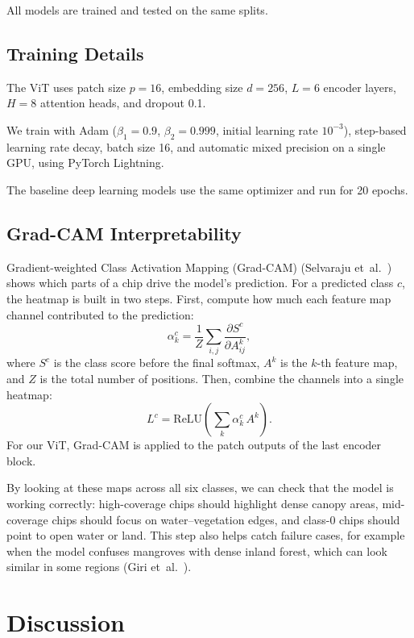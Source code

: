 \documentclass[conference,a4paper]{IEEEtran}
\begin{document}
All models are trained and tested on the same splits.

\subsection{Training Details}

The ViT uses patch size $p=16$, 
embedding size $d=256$, $L=6$ encoder layers, 
$H=8$ attention heads, and dropout 0.1. 

We train with Adam ($\beta_1=0.9$, $\beta_2=0.999$, initial learning rate $10^{-3}$), step-based learning rate decay, batch size 16, and automatic mixed precision on a single GPU, using PyTorch Lightning. 

The baseline deep learning models use the same optimizer and run for 20 epochs.

\subsection{Grad-CAM Interpretability}

Gradient-weighted Class Activation Mapping (Grad-CAM) (Selvaraju et~al.~\cite{selvaraju2017gradcam}) shows which parts of a chip drive the model's prediction. For a predicted class $c$, the heatmap is built in two steps. First, compute how much each feature map channel contributed to the prediction:
\begin{equation}
\alpha_k^c = \frac{1}{Z}\sum_{i,j} \frac{\partial S^c}{\partial A^k_{ij}},
\end{equation}
where $S^c$ is the class score before the final softmax, $A^k$ is the $k$-th feature map, and $Z$ is the total number of positions. Then, combine the channels into a single heatmap:
\begin{equation}
L^c = \mathrm{ReLU}\!\left(\sum_k \alpha_k^c\, A^k\right).
\label{eq:gradcam}
\end{equation}
For our ViT, Grad-CAM is applied to the patch outputs of the last encoder block.

By looking at these maps across all six classes, we can check that the model is working correctly: high-coverage chips should highlight dense canopy areas, mid-coverage chips should focus on water--vegetation edges, and class-0 chips should point to open water or land. This step also helps catch failure cases, for example when the model confuses mangroves with dense inland forest, which can look similar in some regions (Giri et~al.~\cite{article4}).

\section{Discussion}
\end{document}
